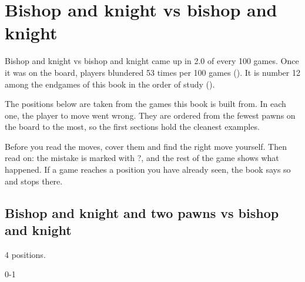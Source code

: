 \chapter{Bishop and knight vs bishop and knight}\label{ch:bishop-and-knight-vs-bishop-and-knight}
Bishop and knight vs bishop and knight came up in 2.0 of every 100 games. Once it was on the board, players blundered 53 times per 100 games (). It is number 12 among the endgames of this book in the order of study ().

The positions below are taken from the games this book is built from. In each one, the player to move went wrong. They are ordered from the fewest pawns on the board to the most, so the first sections hold the cleanest examples.

Before you read the moves, cover them and find the right move yourself. Then read on: the mistake is marked with ?, and the rest of the game shows what happened. If a game reaches a position you have already seen, the book says so and stops there.


\section{Bishop and knight and two pawns vs bishop and knight}
4 positions.


0-1\par
{}

